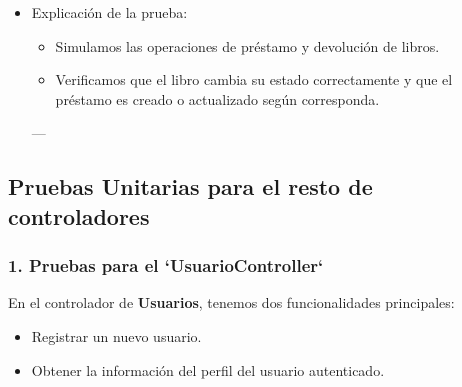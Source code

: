 \documentclass[11pt]{article}
\begin{document}
\begin{itemize}
\begin{verbatim}
        assertEquals(HttpStatus.OK, response.getStatusCode());
        verify(prestamoRepository, times(1)).save(any(Prestamo.class));
    }

    @Test
    void devolverLibro() {
        when(prestamoRepository.findById(1L)).thenReturn(Optional.of(prestamo));
        when(libroRepository.save(libro)).thenReturn(libro);

        ResponseEntity<Void> response = prestamoController.devolverLibro(1L);

        assertEquals(HttpStatus.NO_CONTENT, response.getStatusCode());
        verify(prestamoRepository, times(1)).findById(1L);
        verify(libroRepository, times(1)).save(libro);
    }
}
\end{verbatim}

\item Explicación de la prueba:
\label{sec:orgffcea95}
\begin{itemize}
\item Simulamos las operaciones de préstamo y devolución de libros.
\item Verificamos que el libro cambia su estado correctamente y que el préstamo es creado o actualizado según corresponda.
\end{itemize}

---
\end{itemize}

\subsection{Pruebas Unitarias para el resto de controladores}
\label{sec:org8268752}

\subsubsection{1. Pruebas para el `UsuarioController`}
\label{sec:org881d701}

En el controlador de \textbf{\textbf{Usuarios}}, tenemos dos funcionalidades principales:
\begin{itemize}
\item Registrar un nuevo usuario.
\item Obtener la información del perfil del usuario autenticado.
\end{itemize}
\end{document}
